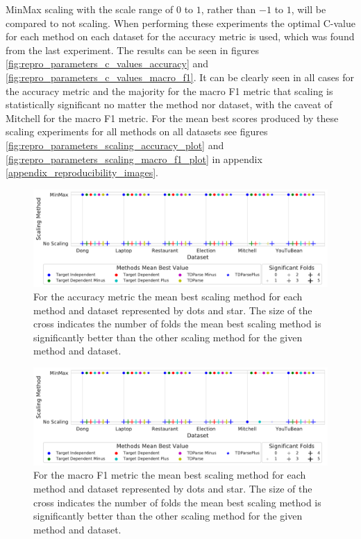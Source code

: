 MinMax scaling with the scale range of $0$ to $1$, rather than \citet{wang-etal-2017-tdparse} $-1$ to $1$, will be compared to not scaling. When performing these experiments the optimal C-value for each method on each dataset for the accuracy metric is used, which was found from the last experiment. The results can be seen in figures \ref{fig:repro_parameters_c_values_accuracy} and \ref{fig:repro_parameters_c_values_macro_f1}. It can be clearly seen in all cases for the accuracy metric and the majority for the macro F1 metric that scaling is statistically significant no matter the method nor dataset, with the caveat of Mitchell for the macro F1 metric. For the mean best scores produced by these scaling experiments for all methods on all datasets see figures \ref{fig:repro_parameters_scaling_accuracy_plot} and \ref{fig:repro_parameters_scaling_macro_f1_plot} in appendix \ref{appendix_reproducibility_images}.

\begin{figure}[!h]
    \centering
    \includegraphics[scale=0.47]{images/reproducibility/Parameters/Scaling/Scaling_Sig_Plot_Accuracy.pdf}
    \caption{For the accuracy metric the mean best scaling method for each method and dataset represented by dots and star. The size of the cross indicates the number of folds the mean best scaling method is significantly better than the other scaling method for the given method and dataset.}
    \label{fig:repro_parameters_scaling_accuracy}
\end{figure}
\begin{figure}[!h]
    \centering
    \includegraphics[scale=0.47]{images/reproducibility/Parameters/Scaling/Scaling_Sig_Plot_F1.pdf}
    \caption{For the macro F1 metric the mean best scaling method for each method and dataset represented by dots and star. The size of the cross indicates the number of folds the mean best scaling method is significantly better than the other scaling method for the given method and dataset.}
    \label{fig:repro_parameters_scaling_macro_f1}
\end{figure}



